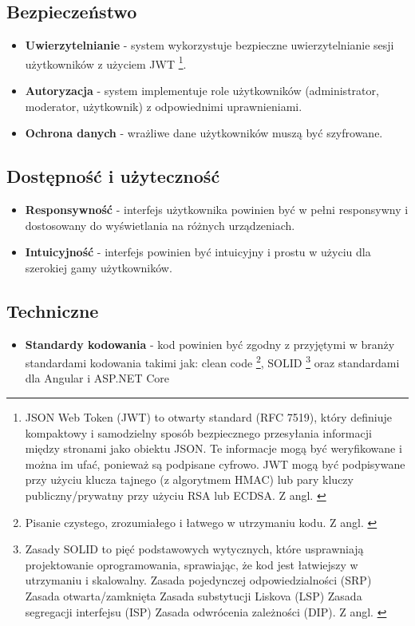\subsection{Bezpieczeństwo}
\begin{itemize}
	\item \textbf{Uwierzytelnianie} - system wykorzystuje bezpieczne uwierzytelnianie sesji użytkowników z użyciem JWT \footnote{JSON Web Token (JWT) to otwarty standard (RFC 7519), który definiuje kompaktowy i samodzielny sposób bezpiecznego przesyłania informacji między stronami jako obiektu JSON. Te informacje mogą być weryfikowane i można im ufać, ponieważ są podpisane cyfrowo. JWT mogą być podpisywane przy użyciu klucza tajnego (z algorytmem HMAC) lub pary kluczy publiczny/prywatny przy użyciu RSA lub ECDSA. Z angl. \cite{jwt.io}}.
	\item \textbf{Autoryzacja} - system implementuje role użytkowników (administrator, moderator, użytkownik) z odpowiednimi uprawnieniami.
	\item \textbf{Ochrona danych} - wrażliwe dane użytkowników muszą być szyfrowane.
\end{itemize}

\subsection{Dostępność i użyteczność}
\begin{itemize}
	\item \textbf{Responsywność} - interfejs użytkownika powinien być w pełni responsywny i dostosowany do wyświetlania na różnych urządzeniach.
	\item \textbf{Intuicyjność} - interfejs powinien być intuicyjny i prostu w użyciu dla szerokiej gamy użytkowników.
\end{itemize}

\subsection{Techniczne}
\begin{itemize}
	\item \textbf{Standardy kodowania} - kod powinien być zgodny z przyjętymi w branży standardami kodowania takimi jak: clean code
	\footnote{Pisanie czystego, zrozumiałego i łatwego w utrzymaniu kodu. Z angl. \cite{freecodecamp.cleancode} \cite{theartofclieancode}}, SOLID
	\footnote{Zasady SOLID to pięć podstawowych wytycznych, które usprawniają projektowanie oprogramowania, sprawiając, że kod jest łatwiejszy w utrzymaniu i skalowalny. Zasada pojedynczej odpowiedzialności (SRP) Zasada otwarta/zamknięta Zasada substytucji Liskova (LSP) Zasada segregacji interfejsu (ISP) Zasada odwrócenia zależności (DIP). Z angl. \cite{geeksforgeeks.solid}}
	oraz standardami dla Angular \cite{Angular_17_Documentation} i ASP.NET Core \cite{ASP.NET_Core_Documentation}
\end{itemize}

